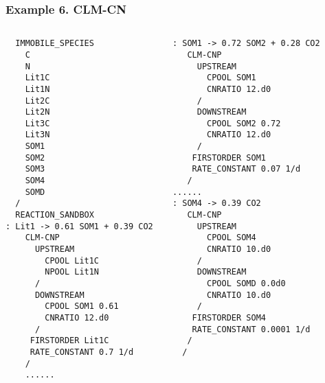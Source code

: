 \documentclass{beamer}
\begin{document}
\begin{frame}[fragile]
\frametitle{Example 6. CLM-CN}

\tiny
\begin{columns}
\column{1.5in}
\begin{verbatim}
  IMMOBILE_SPECIES
    C
    N
    Lit1C
    Lit1N
    Lit2C
    Lit2N
    Lit3C
    Lit3N
    SOM1
    SOM2
    SOM3
    SOM4
    SOMD
  /
  REACTION_SANDBOX
: Lit1 -> 0.61 SOM1 + 0.39 CO2 
    CLM-CNP
      UPSTREAM
        CPOOL Lit1C
        NPOOL Lit1N
      /
      DOWNSTREAM
        CPOOL SOM1 0.61
        CNRATIO 12.d0
      /
     FIRSTORDER Lit1C
     RATE_CONSTANT 0.7 1/d 
    /
    ......
\end{verbatim}  
\column{1.5in}
\begin{verbatim}   
: SOM1 -> 0.72 SOM2 + 0.28 CO2 
   CLM-CNP
     UPSTREAM
       CPOOL SOM1
       CNRATIO 12.d0
     /
     DOWNSTREAM
       CPOOL SOM2 0.72
       CNRATIO 12.d0
     /
    FIRSTORDER SOM1
    RATE_CONSTANT 0.07 1/d 
   /
......
: SOM4 -> 0.39 CO2 
   CLM-CNP
     UPSTREAM
       CPOOL SOM4
       CNRATIO 10.d0
     /
     DOWNSTREAM
       CPOOL SOMD 0.0d0
       CNRATIO 10.d0
     /
    FIRSTORDER SOM4
    RATE_CONSTANT 0.0001 1/d 
   /
  /
\end{verbatim}  
\end{columns}
\end{frame}
\end{document}
